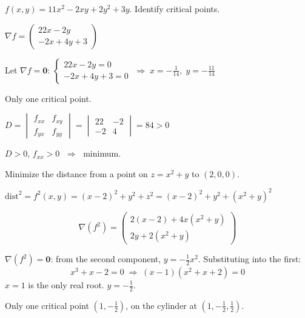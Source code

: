\begin{example}
  $f(x,y)=11x^{2}-2xy+2y^{2}+3y$. Identify critical points.

  $\nabla f =
    \begin{pmatrix}
      22x-2y \\-2x+4y+3
    \end{pmatrix}
  $

  Let $\nabla f=\mathbf{0}$:
  $
    \begin{cases}
      22x-2y=0 \\-2x+4y+3=0
    \end{cases}
    \;\Longrightarrow\;
    x=-\tfrac{1}{14},\; y=-\tfrac{11}{14}$

  Only one critical point.

  $D =
    \begin{vmatrix}
      f_{xx} & f_{xy} \\f_{yx}&f_{yy}
    \end{vmatrix}
    =
    \begin{vmatrix}
      22 & -2 \\-2&4
    \end{vmatrix}
    = 84>0$

  $D>0$, $f_{xx}>0$ $\;\Longrightarrow\;$ minimum.
\end{example}

\begin{example}
  Minimize the distance from a point on $z=x^{2}+y$ to $(2,0,0)$.

  $\text{dist}^{2} = f^{2}(x,y) = (x-2)^{2}+y^{2}+z^{2}
    = (x-2)^{2}+y^{2}+(x^{2}+y)^{2}$

  \[
    \nabla(f^{2})
    =
    \begin{pmatrix}
      2(x-2)+4x(x^{2}+y) \\2y+2(x^{2}+y)
    \end{pmatrix}
  \]

  $\nabla(f^{2})=\mathbf{0}$: from the second component, $y=-\tfrac{1}{2}x^{2}$.
  Substituting into the first:
  \[
    x^{3}+x-2 = 0
    \;\Longrightarrow\;
    (x-1)(x^{2}+x+2)=0
  \]
  $x=1$ is the only real root. $y=-\tfrac{1}{2}$.

  Only one critical point $(1,-\tfrac{1}{2})$,
  on the cylinder at $(1,-\tfrac{1}{2},\tfrac{1}{2})$.
\end{example}


